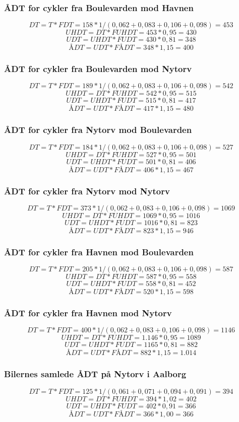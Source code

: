 \subsubsection{ÅDT for cykler fra Boulevarden mod Havnen}
$$DT = T * FDT = 158 * 1/(0,062 +0,083+0,106+0,098) = 453$$
$$UHDT = DT * FUHDT = 453 * 0,95 = 430$$
$$UDT = UHDT * FUDT = 430 * 0,81 = 348$$
$$ÅDT = UDT * FÅDT = 348 * 1,15 = 400$$
\subsubsection{ÅDT for cykler fra Boulevarden mod Nytorv}
$$DT = T * FDT = 189 * 1/(0,062 +0,083+0,106+0,098) = 542$$
$$UHDT = DT * FUHDT = 542 * 0,95 = 515$$
$$UDT = UHDT * FUDT = 515 * 0,81 = 417$$
$$ÅDT = UDT * FÅDT = 417 * 1,15 = 480$$
\subsubsection{ÅDT for cykler fra Nytorv mod Boulevarden}
$$DT = T * FDT = 184* 1/(0,062 +0,083+0,106+0,098) = 527$$
$$UHDT = DT * FUHDT = 527 * 0,95 = 501$$
$$UDT = UHDT * FUDT = 501 * 0,81 = 406$$
$$ÅDT = UDT * FÅDT = 406 * 1,15 = 467$$
\subsubsection{ÅDT for cykler fra Nytorv mod Nytorv}
$$DT = T * FDT = 373 * 1/(0,062 +0,083+0,106+0,098) = 1069$$
$$UHDT = DT * FUHDT = 1069 * 0,95 = 1016$$
$$UDT = UHDT * FUDT = 1016 * 0,81 = 823$$
$$ÅDT = UDT * FÅDT = 823 * 1,15 = 946$$
\subsubsection{ÅDT for cykler fra Havnen mod Boulevarden}
$$DT = T * FDT = 205* 1/(0,062 +0,083+0,106+0,098) = 587$$
$$UHDT = DT * FUHDT = 587 * 0,95 = 558$$
$$UDT = UHDT * FUDT = 558 * 0,81 = 452$$
$$ÅDT = UDT * FÅDT = 520 * 1,15 = 598$$
\subsubsection{ÅDT for cykler fra Havnen mod Nytorv}
$$DT = T * FDT = 400* 1/(0,062 +0,083+0,106+0,098)  = 1146$$
$$UHDT = DT * FUHDT = 1.146 * 0,95 = 1089$$
$$UDT = UHDT * FUDT = 1165 * 0,81 = 882$$
$$ÅDT = UDT * FÅDT = 882 * 1,15 = 1.014$$
\subsubsection{Bilernes samlede ÅDT på Nytorv i Aalborg}
$$DT = T * FDT = 125 * 1/(0,061+0,071+0,094+0,091) = 394$$
$$UHDT = DT * FUHDT = 394 * 1,02 = 402$$
$$UDT = UHDT * FUDT = 402 * 0,91 = 366$$
$$ÅDT = UDT * FÅDT = 366 * 1,00 = 366$$
